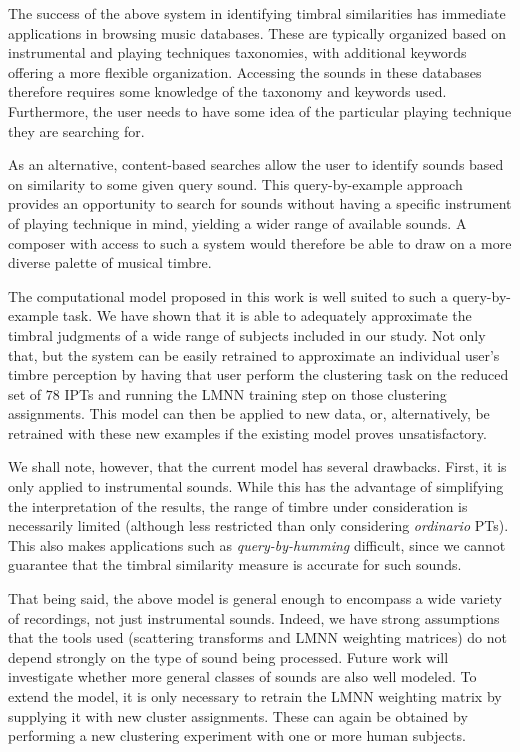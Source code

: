 \documentclass{bmcart}
\begin{document}
The success of the above system in identifying timbral similarities has immediate applications in browsing music databases.
These are typically organized based on instrumental and playing techniques taxonomies, with additional keywords offering a more flexible organization.
Accessing the sounds in these databases therefore requires some knowledge of the taxonomy and keywords used.
Furthermore, the user needs to have some idea of the particular playing technique they are searching for.

As an alternative, content-based searches allow the user to identify sounds based on similarity to some given query sound.
This query-by-example approach provides an opportunity to search for sounds without having a specific instrument of playing technique in mind, yielding a wider range of available sounds.
A composer with access to such a system would therefore be able to draw on a more diverse palette of musical timbre.

The computational model proposed in this work is well suited to such a query-by-example task.
We have shown that it is able to adequately approximate the timbral judgments of a wide range of subjects included in our study.
Not only that, but the system can be easily retrained to approximate an individual user's timbre perception by having that user perform the clustering task on the reduced set of $78$ IPTs and running the LMNN training step on those clustering assignments.
This model can then be applied to new data, or, alternatively, be retrained with these new examples if the existing model proves unsatisfactory.

We shall note, however, that the current model has several drawbacks.
First, it is only applied to instrumental sounds.
While this has the advantage of simplifying the interpretation of the results, the range of timbre under consideration is necessarily limited (although less restricted than only considering \emph{ordinario} PTs).
This also makes applications such as \emph{query-by-humming} difficult, since we cannot guarantee that the timbral similarity measure is accurate for such sounds.

That being said, the above model is general enough to encompass a wide variety of recordings, not just instrumental sounds.
Indeed, we have strong assumptions that the tools used (scattering transforms and LMNN weighting matrices) do not depend strongly on the type of sound being processed. Future work will investigate whether more general classes of sounds are also well modeled.
To extend the model, it is only necessary to retrain the LMNN weighting matrix by supplying it with new cluster assignments.
These can again be obtained by performing a new clustering experiment with one or more human subjects.
\end{document}
